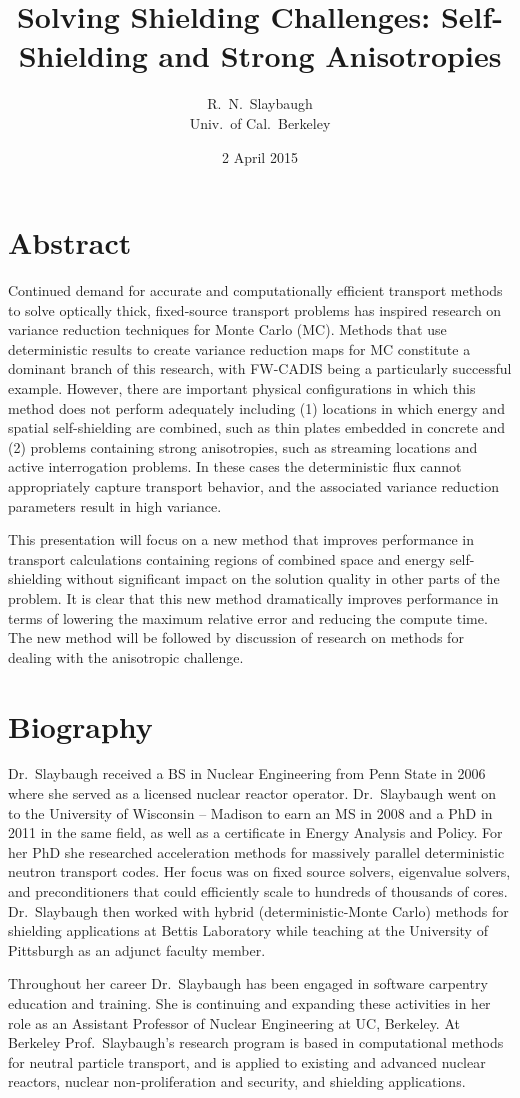 \documentclass[12pt]{article}
\title{Solving Shielding Challenges: Self-Shielding and Strong Anisotropies}
\author{R.\ N.\ Slaybaugh \\ Univ.\ of Cal.\ Berkeley}
\date{2 April 2015}
\begin{document}
\maketitle

\section*{Abstract}

Continued demand for accurate and computationally efficient transport methods to solve optically thick, fixed-source transport problems has inspired research on variance reduction techniques for Monte Carlo (MC). Methods that use deterministic results to create variance reduction maps for MC constitute a dominant branch of this research, with FW-CADIS being a particularly successful example. However, there are important physical configurations in which this method does not perform adequately including (1) locations in which energy and spatial self-shielding are combined, such as thin plates embedded in concrete and (2) problems containing strong anisotropies, such as streaming locations and active interrogation problems. In these cases the deterministic flux cannot appropriately capture transport behavior, and the associated variance reduction parameters result in high variance. 

This presentation will focus on a new method that improves performance in transport calculations containing regions of combined space and energy self-shielding without significant impact on the solution quality in other parts of the problem. It is clear that this new method dramatically improves performance in terms of lowering the maximum relative error and reducing the compute time. The new method will be followed by discussion of research on methods for dealing with the anisotropic challenge.

\section*{Biography}
Dr.\ Slaybaugh received a BS in Nuclear Engineering from Penn State in 2006 where she served as a licensed nuclear reactor operator. Dr.\ Slaybaugh went on to the University of Wisconsin -- Madison to earn an MS in 2008 and a PhD in 2011 in the same field, as well as a certificate in Energy Analysis and Policy. For her PhD she researched acceleration methods for massively parallel deterministic neutron transport codes. Her focus was on fixed source solvers, eigenvalue solvers, and preconditioners that could efficiently scale to hundreds of thousands of cores. Dr.\ Slaybaugh then worked with hybrid (deterministic-Monte Carlo) methods for shielding applications at Bettis Laboratory while teaching at the University of Pittsburgh as an adjunct faculty member. 

Throughout her career Dr.\ Slaybaugh has been engaged in software carpentry education and training. She is continuing and expanding these activities in her role as an Assistant Professor of Nuclear Engineering at UC, Berkeley. At Berkeley Prof.\ Slaybaugh's research program is based in computational methods for neutral particle transport, and is applied to existing and advanced nuclear reactors, nuclear non-proliferation and security, and shielding applications. 
\end{document}
